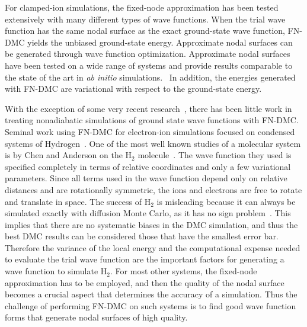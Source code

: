 \documentclass[aip,jcp,numerical,reprint]{revtex4-1}
\begin{document}
For clamped-ion simulations, the fixed-node approximation has been tested extensively with many different types of wave functions.  When the trial wave function has the same nodal surface as the exact ground-state wave function, FN-DMC yields the unbiased ground-state energy.  Approximate nodal surfaces can be generated through wave function optimization.  Approximate nodal surfaces have been tested on a wide range of systems and provide results comparable to the state of the art in \textit{ab initio} simulations.~\cite{Stuart_Review,rothstein1,grossman1,Yang2015,Tubman_Release} In addition, the energies generated with FN-DMC are variational with respect to the ground-state energy.


With the exception of some very recent research~\cite{Tubman_ECG,Yang2015}, there has been little work in treating nonadiabatic simulations of ground state wave functions with FN-DMC. Seminal work using FN-DMC for electron-ion simulations focused on condensed systems of Hydrogen~\cite{Ceperley_1987,Natoli_1993,Natoli_1995}.  One of the most well known studies of a molecular system is by Chen and Anderson   on  the H$_{2}$ molecule~\cite{chen1995}. %
  The wave function they used is specified completely in terms of relative coordinates and only a few variational parameters. Since all terms used in the wave function depend only on relative distances and are rotationally symmetric, the ions and electrons are free to rotate and translate in space. 
The success of H$_{2}$ is misleading because it can always be simulated exactly with diffusion Monte Carlo, as it has no sign problem~\cite{Tubman_Release}.  This implies that there are no systematic biases in the DMC simulation, and thus the best DMC results can be considered those that have the smallest error bar.  Therefore the variance of the local energy and the computational expense needed to evaluate the trial wave function are the important factors for generating a wave function to simulate H$_{2}$.  For most other systems, the fixed-node approximation has to be employed, and then the quality of the nodal surface becomes a crucial aspect that determines the accuracy of a simulation.  Thus the challenge of performing FN-DMC on such systems is to find good wave function forms that generate nodal surfaces of high quality.
\end{document}
